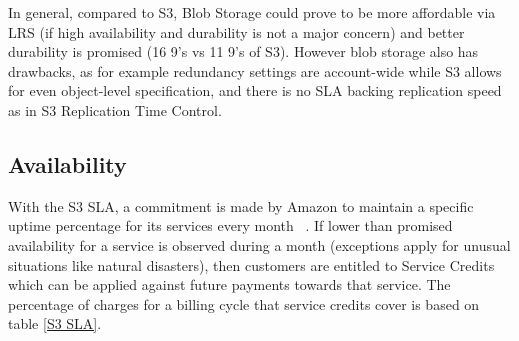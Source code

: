 In general, compared to S3, Blob Storage could prove to be more affordable via LRS (if high availability and durability is not a major concern) and better durability is promised (16 9's vs 11 9's of S3). However blob storage also has drawbacks, as for example redundancy settings are account-wide while S3 allows for even object-level specification, and there is no SLA backing replication speed as in S3 Replication Time Control.

\subsection{Availability}
With the S3 SLA, a commitment is made by Amazon to maintain a specific uptime percentage for its services every month ~\cite{s3sla}. If lower than promised availability for a service is observed during a month (exceptions apply for unusual situations like natural disasters), then customers are entitled to Service Credits which can be applied against future payments towards that service. The percentage of charges for a billing cycle that service credits cover is based on table \ref{S3 SLA}.

\begin{table}[h]
    \caption{\label{S3 SLA}S3 Availability SLA}
\end{table}

